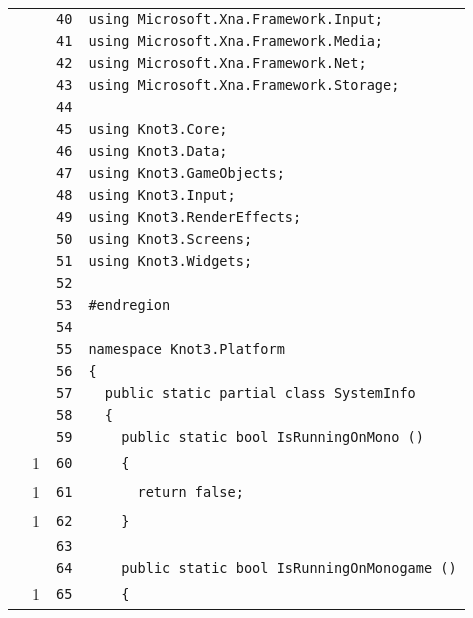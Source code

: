 \documentclass[a4paper,10pt]{article}
\begin{document}
\begin{longtable}[l]{lrrl}
\cellcolor{gray} &  & \verb~40~ & \verb~using Microsoft.Xna.Framework.Input;~\\
\cellcolor{gray} &  & \verb~41~ & \verb~using Microsoft.Xna.Framework.Media;~\\
\cellcolor{gray} &  & \verb~42~ & \verb~using Microsoft.Xna.Framework.Net;~\\
\cellcolor{gray} &  & \verb~43~ & \verb~using Microsoft.Xna.Framework.Storage;~\\
\cellcolor{gray} &  & \verb~44~ & \verb~~\\
\cellcolor{gray} &  & \verb~45~ & \verb~using Knot3.Core;~\\
\cellcolor{gray} &  & \verb~46~ & \verb~using Knot3.Data;~\\
\cellcolor{gray} &  & \verb~47~ & \verb~using Knot3.GameObjects;~\\
\cellcolor{gray} &  & \verb~48~ & \verb~using Knot3.Input;~\\
\cellcolor{gray} &  & \verb~49~ & \verb~using Knot3.RenderEffects;~\\
\cellcolor{gray} &  & \verb~50~ & \verb~using Knot3.Screens;~\\
\cellcolor{gray} &  & \verb~51~ & \verb~using Knot3.Widgets;~\\
\cellcolor{gray} &  & \verb~52~ & \verb~~\\
\cellcolor{gray} &  & \verb~53~ & \verb~#endregion~\\
\cellcolor{gray} &  & \verb~54~ & \verb~~\\
\cellcolor{gray} &  & \verb~55~ & \verb~namespace Knot3.Platform~\\
\cellcolor{gray} &  & \verb~56~ & \verb~{~\\
\cellcolor{gray} &  & \verb~57~ & \verb~  public static partial class SystemInfo~\\
\cellcolor{gray} &  & \verb~58~ & \verb~  {~\\
\cellcolor{gray} &  & \verb~59~ & \verb~    public static bool IsRunningOnMono ()~\\
\cellcolor{green} & 1 & \verb~60~ & \verb~    {~\\
\cellcolor{green} & 1 & \verb~61~ & \verb~      return false;~\\
\cellcolor{green} & 1 & \verb~62~ & \verb~    }~\\
\cellcolor{gray} &  & \verb~63~ & \verb~~\\
\cellcolor{gray} &  & \verb~64~ & \verb~    public static bool IsRunningOnMonogame ()~\\
\cellcolor{green} & 1 & \verb~65~ & \verb~    {~\\

\end{longtable}
\end{document}

